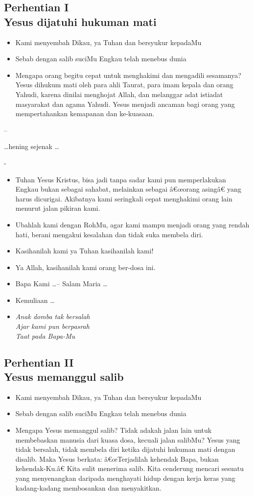 \documentclass[a5paper,headsepline,titlepage,10pt,nnormalheadings,DIVcalc]{scrbook}
\newcommand{\BU}[1]{\begin{itemize} \item[U:] #1 \end{itemize}}
\newcommand{\BP}[1]{\begin{itemize} \item[P:] #1 \end{itemize}}
\newcommand{\BL}[1]{\begin{itemize} \item[L:] #1 \end{itemize}}
\begin{document}
\subsection*{Perhentian I\\
Yesus dijatuhi hukuman mati}

\BP{Kami menyembah Dikau, ya Tuhan dan bersyukur kepadaMu}
\BU{Sebab dengan salib suciMu Engkau telah menebus dunia}
\BL{Mengapa orang begitu cepat untuk menghakimi dan mengadili sesamanya? Yesus dihukum mati oleh para ahli Taurat, para imam kepala dan orang Yahudi, karena dinilai menghojat Allah, dan melanggar adat istiadat masyarakat dan agama Yahudi. Yesus menjadi ancaman bagi orang yang mempertahankan kemapanan dan ke-kuasaan.}

--\begin{center}\dots hening sejenak \dots\end{center}-

\BP{Tuhan Yesus Kristus, bisa jadi tanpa sadar kami pun memperlakukan Engkau bukan sebagai sahabat, melainkan sebagai â€œorang asingâ€ yang harus dicurigai. Akibatnya kami seringkali cepat menghakimi orang lain menurut jalan pikiran kami.}
\BU{Ubahlah kami dengan RohMu, agar kami mampu menjadi orang yang rendah hati, berani mengakui kesalahan dan tidak suka membela diri.}
\BP{Kasihanilah kami ya Tuhan kasihanilah kami!}
\BU{Ya Allah, kasihanilah kami orang ber-dosa ini.}
\BP{Bapa Kami \dots -- Salam Maria \dots}
\BP{Kemuliaan \dots}

\begin{itemize}
\item[2.] \it{Anak domba tak bersalah\\
Ajar kami pun berpasrah\\
Taat pada Bapa-Mu}
\end{itemize}

\subsection*{Perhentian II
\\Yesus memanggul salib}

\BP{Kami menyembah Dikau, ya Tuhan dan bersyukur kepadaMu}
\BU{Sebab dengan salib suciMu Engkau telah menebus dunia}
\BL{Mengapa Yesus memanggul salib? Tidak adakah jalan lain untuk membebaskan manusia dari kuasa dosa, kecuali jalan salibMu? Yesus yang tidak bersalah, tidak membela diri ketika dijatuhi hukuman mati dengan disalib. Maka Yesus berkata: â€œTerjadilah kehendak Bapa, bukan kehendak-Ku.â€ Kita sulit menerima salib. Kita cenderung mencari sesuatu yang menyenangkan daripada menghayati hidup dengan kerja keras yang kadang-kadang membosankan dan menyakitkan.}
\end{document}
